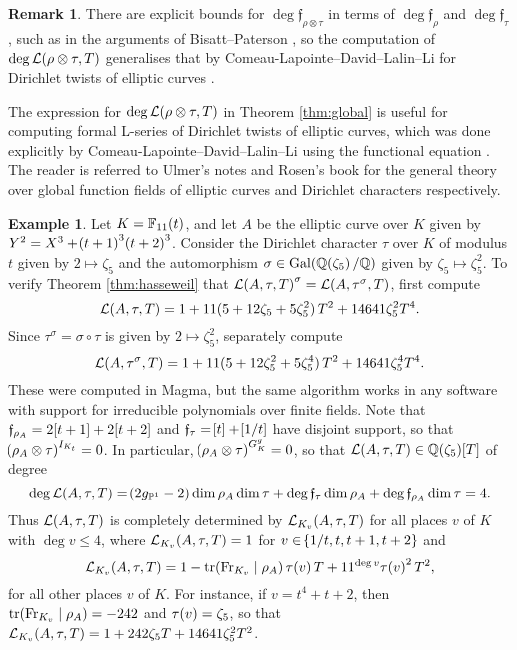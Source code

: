 \documentclass{article}
\theoremstyle{definition}
\theoremstyle{definition}
\newtheorem{remark}[n]{Remark}
\newtheorem{example}[n]{Example}
\newcommand{\FF}{\mathbb{F}}
\newcommand{\ffff}{\mathfrak{f}}
\newcommand{\Fr}{\mathrm{Fr}}
\newcommand{\Gal}{\mathrm{Gal}}
\newcommand{\LLL}{\mathcal{L}}
\newcommand{\PP}{\mathbb{P}}
\newcommand{\QQ}{\mathbb{Q}}
\newcommand{\st}{\mid}
\newcommand{\tr}{\mathrm{tr}}
\newcommand{\br}{\!\del[0]}
\begin{document}
\begin{remark}
There are explicit bounds for $ \deg\ffff_{\rho \otimes \tau} $ in terms of $ \deg\ffff_\rho $ and $ \deg\ffff_\tau $, such as in the arguments of Bisatt--Paterson \cite[Section 2]{BP23}, so the computation of $ \deg\LLL\br{\rho \otimes \tau, T} $ generalises that by Comeau-Lapointe--David--Lalin--Li for Dirichlet twists of elliptic curves \cite[Theorem 2.2]{CLDLL22}.
\end{remark}

The expression for $ \deg\LLL\br{\rho \otimes \tau, T} $ in Theorem \ref{thm:global} is useful for computing formal L-series of Dirichlet twists of elliptic curves, which was done explicitly by Comeau-Lapointe--David--Lalin--Li using the functional equation \cite[Section 5.1]{CLDLL22}. The reader is referred to Ulmer's notes \cite[Lecture 1]{Ulm11} and Rosen's book \cite[Chapter 4 and Chapter 9]{Ros02} for the general theory over global function fields of elliptic curves and Dirichlet characters respectively.

\begin{example}
Let $ K = \FF_{11}\br{t} $, and let $ A $ be the elliptic curve over $ K $ given by $ Y^2 = X^3 + \br{t + 1}^3\br{t + 2}^3 $. Consider the Dirichlet character $ \tau $ over $ K $ of modulus $ t $ given by $ 2 \mapsto \zeta_5 $ and the automorphism $ \sigma \in \Gal\br{\QQ\br{\zeta_5} / \QQ} $ given by $ \zeta_5 \mapsto \zeta_5^2 $. To verify Theorem \ref{thm:hasseweil} that $ \LLL\br{A, \tau, T}^\sigma = \LLL\br{A, \tau^\sigma, T} $, first compute
$$ \LLL\br{A, \tau, T} = 1 + 11\br{5 + 12\zeta_5 + 5\zeta_5^2}T^2 + 14641\zeta_5^2T^4. $$
Since $ \tau^\sigma = \sigma \circ \tau $ is given by $ 2 \mapsto \zeta_5^2 $, separately compute
$$ \LLL\br{A, \tau^\sigma, T} = 1 + 11\br{5 + 12\zeta_5^2 + 5\zeta_5^4}T^2 + 14641\zeta_5^4T^4. $$
These were computed in Magma, but the same algorithm works in any software with support for irreducible polynomials over finite fields. Note that $ \ffff_{\rho_A} = 2\sbr{t + 1} + 2\sbr{t + 2} $ and $ \ffff_\tau = \sbr{t} + \sbr{1 / t} $ have disjoint support, so that $ \br{\rho_A \otimes \tau}^{I_{K_t}} = 0 $. In particular, $ \br{\rho_A \otimes \tau}^{G_K^g} = 0 $, so that $ \LLL\br{A, \tau, T} \in \QQ\br{\zeta_5}\sbr{T} $ of degree
$$ \deg\LLL\br{A, \tau, T} = \br{2g_{\PP^1} - 2}\dim\rho_A\dim\tau + \deg\ffff_\tau\dim\rho_A + \deg\ffff_{\rho_A}\dim\tau = 4. $$
Thus $ \LLL\br{A, \tau, T} $ is completely determined by $ \LLL_{K_v}\br{A, \tau, T} $ for all places $ v $ of $ K $ with $ \deg v \le 4 $, where $ \LLL_{K_v}\br{A, \tau, T} = 1 $ for $ v \in \cbr{1 / t, t, t + 1, t + 2} $ and
$$ \LLL_{K_v}\br{A, \tau, T} = 1 - \tr\br{\Fr_{K_v} \st \rho_A}\tau\br{v}T + 11^{\deg v}\tau\br{v}^2T^2, $$
for all other places $ v $ of $ K $. For instance, if $ v = t^4 + t + 2 $, then $ \tr\br{\Fr_{K_v} \st \rho_A} = -242 $ and $ \tau\br{v} = \zeta_5 $, so that $ \LLL_{K_v}\br{A, \tau, T} = 1 + 242\zeta_5T + 14641\zeta_5^2T^2 $.
\end{example}
\end{document}
